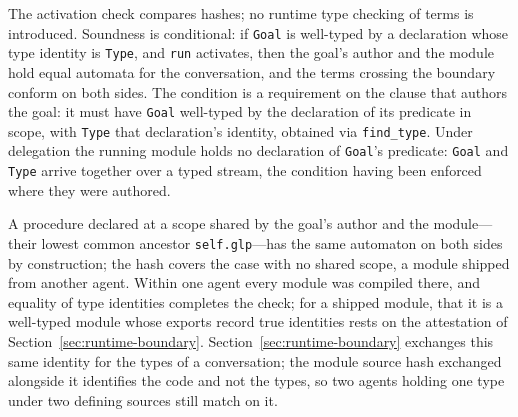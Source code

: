 The activation check compares hashes; no runtime type checking of terms is introduced.  Soundness is conditional: if \verb|Goal| is well-typed by a declaration whose type identity is \verb|Type|, and \verb|run| activates, then the goal's author and the module hold equal automata for the conversation, and the terms crossing the boundary conform on both sides.  The condition is a requirement on the clause that authors the goal: it must have \verb|Goal| well-typed by the declaration of its predicate in scope, with \verb|Type| that declaration's identity, obtained via \verb|find_type|.  Under delegation the running module holds no declaration of \verb|Goal|'s predicate: \verb|Goal| and \verb|Type| arrive together over a typed stream, the condition having been enforced where they were authored.

A procedure declared at a scope shared by the goal's author and the module---their lowest common ancestor \verb|self.glp|---has the same automaton on both sides by construction; the hash covers the case with no shared scope, a module shipped from another agent.  Within one agent every module was compiled there, and equality of type identities completes the check; for a shipped module, that it is a well-typed module whose exports record true identities rests on the attestation of Section~\ref{sec:runtime-boundary}.  Section~\ref{sec:runtime-boundary} exchanges this same identity for the types of a conversation; the module source hash exchanged alongside it identifies the code and not the types, so two agents holding one type under two defining sources still match on it.

